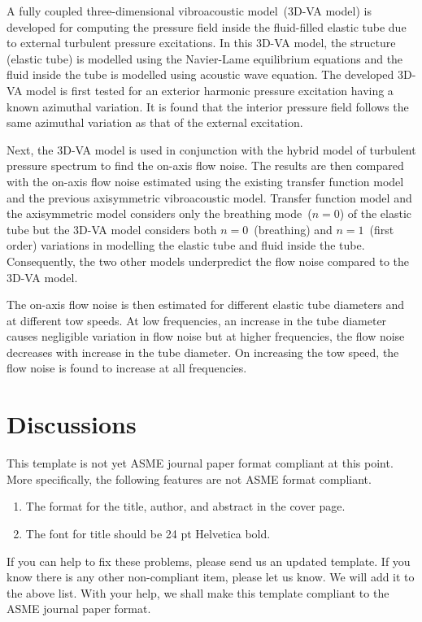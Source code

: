 \documentclass[twocolumn,10pt]{asme2ej}
\begin{document}
A fully coupled three-dimensional vibroacoustic model~(3D-VA model) is developed for computing the pressure field inside the fluid-filled elastic tube due to external turbulent pressure excitations. In this 3D-VA model, the structure (elastic tube) is modelled using the Navier-Lame equilibrium equations and the fluid inside the tube is modelled using acoustic wave equation. The developed 3D-VA model is first tested for an exterior harmonic pressure excitation having a known azimuthal variation. It is found that the interior pressure field follows the same azimuthal variation as that of the external excitation.

Next, the 3D-VA model is used in conjunction with the hybrid model of turbulent pressure spectrum to find the on-axis flow noise. The results are then compared with the on-axis flow noise estimated using the existing transfer function model~\cite{knight1996} and the previous axisymmetric vibroacoustic model. Transfer function model and the axisymmetric model considers only the breathing mode~($n=0$) of the elastic tube but the 3D-VA model considers both $n=0$~(breathing) and $n=1$~(first order) variations in modelling the elastic tube and fluid inside the tube. Consequently, the two other models underpredict the flow noise compared to the 3D-VA model.

The on-axis flow noise is then estimated for different elastic tube diameters and at different tow speeds. At low frequencies, an increase in the tube diameter causes negligible variation in flow noise but at higher frequencies, the flow noise decreases with increase in the tube diameter. On increasing the tow speed, the flow noise is found to increase at all frequencies.



\section{Discussions}
This template is not yet ASME journal paper format compliant at this point.
More specifically, the following features are not ASME format compliant.
\begin{enumerate}
\item
The format for the title, author, and abstract in the cover page.
\item
The font for title should be 24 pt Helvetica bold.
\end{enumerate}

\noindent
If you can help to fix these problems, please send us an updated template.
If you know there is any other non-compliant item, please let us know.
We will add it to the above list.
With your help, we shall make this template 
compliant to the ASME journal paper format.
\end{document}
